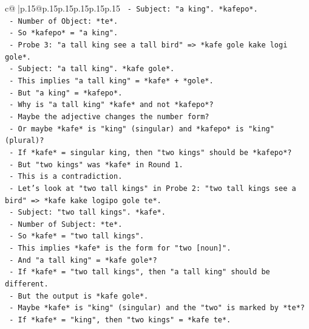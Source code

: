 \documentclass{article}
\begin{document}
{\begin{supertabular}{c@{$\;$}|p{.15\linewidth}@{}p{.15\linewidth}p{.15\linewidth}p{.15\linewidth}p{.15\linewidth}p{.15\linewidth}}
{{{\texttt{            {-} Subject: "a king". *kafepo*.} \\
\texttt{            {-} Number of Object: *te*.} \\
\texttt{            {-} So *kafepo* = "a king".} \\
\texttt{          {-} Probe 3: "a tall king see a tall bird" => *kafe gole kake logi gole*.} \\
\texttt{            {-} Subject: "a tall king". *kafe gole*.} \\
\texttt{            {-} This implies "a tall king" = *kafe* + *gole*.} \\
\texttt{            {-} But "a king" = *kafepo*.} \\
\texttt{            {-} Why is "a tall king" *kafe* and not *kafepo*?} \\
\texttt{            {-} Maybe the adjective changes the number form?} \\
\texttt{            {-} Or maybe *kafe* is "king" (singular) and *kafepo* is "king" (plural)?} \\
\texttt{            {-} If *kafe* = singular king, then "two kings" should be *kafepo*?} \\
\texttt{            {-} But "two kings" was *kafe* in Round 1.} \\
\texttt{            {-} This is a contradiction.} \\
\texttt{            {-} Let's look at "two tall kings" in Probe 2: "two tall kings see a bird" => *kafe kake logipo gole te*.} \\
\texttt{              {-} Subject: "two tall kings". *kafe*.} \\
\texttt{              {-} Number of Subject: *te*.} \\
\texttt{              {-} So *kafe* = "two tall kings".} \\
\texttt{              {-} This implies *kafe* is the form for "two {[}noun{]}".} \\
\texttt{              {-} And "a tall king" = *kafe gole*?} \\
\texttt{              {-} If *kafe* = "two tall kings", then "a tall king" should be different.} \\
\texttt{              {-} But the output is *kafe gole*.} \\
\texttt{              {-} Maybe *kafe* is "king" (singular) and the "two" is marked by *te*?} \\
\texttt{              {-} If *kafe* = "king", then "two kings" = *kafe te*.} \\
}}}
\end{supertabular}}
\end{document}
